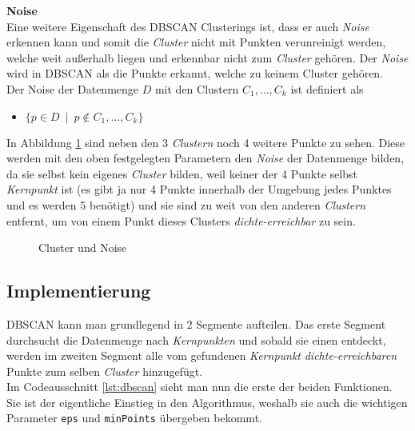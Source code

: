 \documentclass{lni}
\begin{document}
    
\textbf{Noise}\\
Eine weitere Eigenschaft des DBSCAN Clusterings ist, dass er auch \textit{Noise} erkennen kann und somit die \textit{Cluster} nicht mit Punkten verunreinigt werden, welche weit außerhalb liegen und erkennbar nicht zum \textit{Cluster} gehören. Der \textit{Noise} wird in DBSCAN als die Punkte erkannt, welche zu keinem Cluster gehören.\\
Der Noise der Datenmenge $D$ mit den Clustern $C_1,\dots,C_k$ ist definiert als
\begin{itemize}
    \item $ \{ p \in D \enspace | \enspace p \notin C_1,\dots,C_k \} $
\end{itemize}
In Abbildung \ref{fig:3} sind neben den 3 \textit{Clustern} noch 4 weitere Punkte zu sehen. Diese werden mit den oben festgelegten Parametern den \textit{Noise} der Datenmenge bilden, da sie selbst kein eigenes \textit{Cluster} bilden, weil keiner der 4 Punkte selbst \textit{Kernpunkt} ist (es gibt ja nur 4 Punkte innerhalb der Umgebung jedes Punktes und es werden 5 benötigt) und sie sind zu weit von den anderen \textit{Clustern} entfernt, um von einem Punkt dieses Clusters \textit{dichte-erreichbar} zu sein.


\begin{figure}[hb]
    \centering
    
    \caption{Cluster und Noise}
    \label{fig:3}
\end{figure}

%
%

\subsection{Implementierung}
\label{sec:impl}
DBSCAN kann man grundlegend in 2 Segmente aufteilen. Das erste Segment durchsucht die Datenmenge nach \textit{Kernpunkten} und sobald sie einen entdeckt, werden im zweiten Segment alle vom gefundenen \textit{Kernpunkt} \textit{dichte-erreichbaren} Punkte zum selben \textit{Cluster} hinzugefügt.\\


Im Codeausschnitt \ref{lst:dbscan} sieht man nun die erste der beiden Funktionen. Sie ist der eigentliche Einstieg in den Algorithmus, weshalb sie auch die wichtigen Parameter \lstinline{eps} und \lstinline{minPoints} übergeben bekommt.\\
\end{document}
